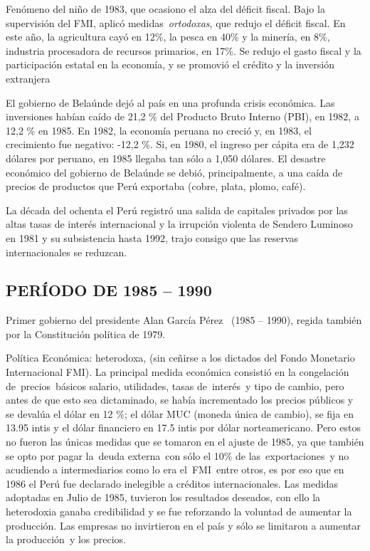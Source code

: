 \documentclass[
  letterpaper,
  DIV=11,
  numbers=noendperiod]{scrartcl}
\begin{document}
Fenómeno del niño de 1983, que ocasiono el alza del déficit fiscal. Bajo
la supervisión del FMI, aplicó medidas~\emph{ortodoxas}, que redujo el
déficit fiscal. En este año, la agricultura cayó en 12\%, la pesca en
40\% y la minería, en 8\%, industria procesadora de recursos primarios,
en 17\%. Se redujo el gasto fiscal y la participación estatal en la
economía, y se promovió el crédito y la inversión extranjera

El gobierno de Belaúnde dejó al país en una profunda crisis económica.
Las inversiones habían caído de 21,2 \% del Producto Bruto Interno
(PBI), en 1982, a 12,2 \% en 1985. En 1982, la economía peruana no
creció y, en 1983, el crecimiento fue negativo: -12,2 \%. Si, en 1980,
el ingreso per cápita era de 1,232 dólares por peruano, en 1985 llegaba
tan sólo a 1,050 dólares. El desastre económico del gobierno de Belaúnde
se debió, principalmente, a una caída de precios de productos que Perú
exportaba (cobre, plata, plomo, café).

La década del ochenta el Perú registró una salida de capitales privados
por las altas tasas de interés internacional y la irrupción violenta de
Sendero Luminoso en 1981 y su subsistencia hasta 1992, trajo consigo que
las reservas internacionales se reduzcan.

\hypertarget{peruxedodo-de-1985-1990}{%
\subsection{PERÍODO DE 1985 -- 1990}\label{peruxedodo-de-1985-1990}}

Primer gobierno del presidente Alan García Pérez~ (1985 -- 1990), regida
también por la Constitución política de 1979.

Política Económica: heterodoxa, (sin ceñirse a los dictados del Fondo
Monetario Internacional FMI). La principal medida económica consistió en
la congelación de~precios~básicos salario, utilidades, tasas
de~interés~y tipo de cambio, pero antes de que esto sea dictaminado, se
había incrementado los precios públicos y se devalúa el dólar en 12 \%;
el dólar MUC (moneda única de cambio), se fija en 13.95 intis y el dólar
financiero en 17.5 intis por dólar norteamericano. Pero estos no fueron
las únicas medidas que se tomaron en el ajuste de 1985, ya que también
se opto por pagar la~deuda externa~con sólo el 10\% de
las~exportaciones~y no acudiendo a intermediarios como lo era
el~FMI~entre otros, es por eso que en 1986 el Perú fue declarado
inelegible a créditos internacionales. Las medidas adoptadas en Julio de
1985, tuvieron los resultados deseados, con ello la heterodoxia ganaba
credibilidad y se fue reforzando la voluntad de aumentar la producción.
Las empresas no invirtieron en el país y sólo se limitaron a aumentar la
producción~y los precios.
\end{document}
